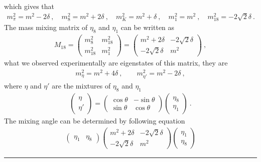 \documentclass[12pt,twoside]{report}
\numberwithin{problemname}{chapter}
\newenvironment{solution}{\vspace{1em}\par\noindent{\large\textbf{\textsc{Solution}}}\par}{\vspace{1em}\hrule}
\begin{document}
\begin{solution}
which gives that
\begin{align}
    m^2_{\pi}=m^2-2\delta\ ,\quad m^2_8=m^2+2\delta\ ,\quad m^2_{K}=m^2+\delta\ ,\quad m^2_1=m^2\ ,\quad m^2_{18}=-2\sqrt{2}\delta\ .\nonumber
\end{align}
The mass mixing matrix of $\eta_8$ and $\eta_1$ can be written as
\begin{align}
    M_{18}=
    \begin{pmatrix}
       m^2_8 & m^2_{18} \\
       m^2_{18} & m^2_1
    \end{pmatrix}
    =
    \begin{pmatrix}
       m^2+2\delta & -2\sqrt{2}\delta \\
       -2\sqrt{2}\delta & m^2
    \end{pmatrix}\ ,
\end{align}
what we observed experimentally are eigenstates of this matrix, they are
\begin{align}
    m^2_{\eta}=m^2+4\delta\ ,\quad\quad m^2_{\eta'}=m^2-2\delta\ , \nonumber
\end{align}
where $\eta$ and $\eta'$ are the mixtures of $\eta_8$ and $\eta_1$
\begin{align}
    \begin{pmatrix}
       \eta \\
       \eta'
    \end{pmatrix}
    =
    \begin{pmatrix}
       \cos{\theta} & -\sin{\theta} \\
       \sin{\theta} & \cos{\theta}
    \end{pmatrix}
    \begin{pmatrix}
       \eta_8 \\
       \eta_1
    \end{pmatrix}\ . \label{Eq:18Mix}
\end{align}
The mixing angle can be determined by following equation
\begin{align}
    \begin{pmatrix}
       \eta_1 & \eta_8
    \end{pmatrix}
    \begin{pmatrix}
       m^2+2\delta & -2\sqrt{2}\delta \\
       -2\sqrt{2}\delta & m^2
    \end{pmatrix}
    \begin{pmatrix}
       \eta_1 \\
       \eta_8
    \end{pmatrix}

\end{align}
\end{solution}
\end{document}
